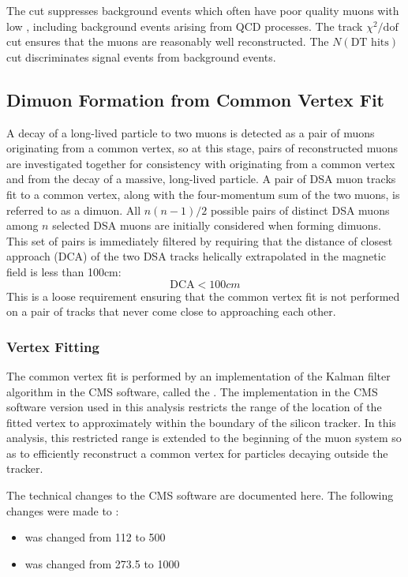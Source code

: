 The \pT cut suppresses background events which often have poor quality muons with low \pT, including background events arising from QCD processes.
The track $\chi^2/\text{dof}$ cut ensures that the muons are reasonably well reconstructed.
The $N(\text{DT hits})$ cut discriminates signal events from background events.

\subsection{Dimuon Formation from Common Vertex Fit}
A decay of a long-lived particle to two muons is detected as a pair of muons originating from a common vertex, so at this stage, pairs of reconstructed muons are investigated together for consistency with originating from a common vertex and from the decay of a massive, long-lived particle.
A pair of DSA muon tracks fit to a common vertex, along with the four-momentum sum of the two muons, is referred to as a dimuon.
All $n(n-1)/2$ possible pairs of distinct DSA muons among $n$ selected DSA muons are initially considered when forming dimuons.
This set of pairs is immediately filtered by requiring that the distance of closest approach (DCA) of the two DSA tracks helically extrapolated in the magnetic field is less than 100\unit{cm}:
$$\text{DCA} < 100\unit{cm}$$
This is a loose requirement ensuring that the common vertex fit is not performed on a pair of tracks that never come close to approaching each other.

\subsubsection{Vertex Fitting}
The common vertex fit is performed by an implementation of the Kalman filter algorithm in the CMS software, called the .
The implementation in the CMS software version used in this analysis restricts the range of the location of the fitted vertex to approximately within the boundary of the silicon tracker.
In this analysis, this restricted range is extended to the beginning of the muon system so as to efficiently reconstruct a common vertex for particles decaying outside the tracker.

The technical changes to the CMS software are documented here.
The following changes were made to :
\begin{itemize}
  \item {} was changed from 112 to 500
  \item {} was changed from 273.5 to 1000
\end{itemize}

